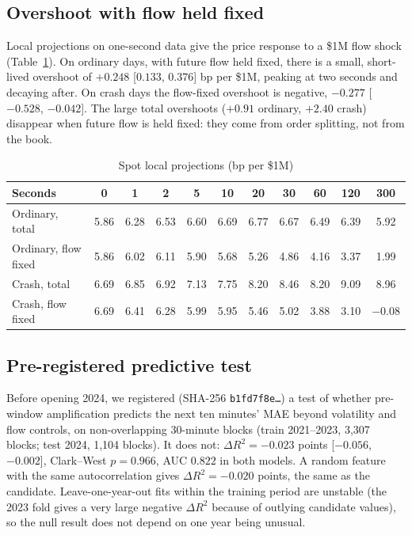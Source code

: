 \documentclass[12pt]{article}
\theoremstyle{definition}
\theoremstyle{remark}
\begin{document}
\subsection{Overshoot with flow held fixed}
Local projections on one-second data give the price response to a \$1M flow shock (Table~\ref{tab:spotlp}). On ordinary days, with future flow held fixed, there is a small, short-lived overshoot of $+0.248$ [$0.133$, $0.376$] bp per \$1M, peaking at two seconds and decaying after. On crash days the flow-fixed overshoot is negative, $-0.277$ [$-0.528$, $-0.042$]. The large total overshoots ($+0.91$ ordinary, $+2.40$ crash) disappear when future flow is held fixed: they come from order splitting, not from the book.

\begin{table}[t]\centering\small
\begin{threeparttable}
\caption{Spot local projections (bp per \$1M)}\label{tab:spotlp}
\setlength{\tabcolsep}{3.5pt}
\begin{tabular}{lcccccccccc}
\toprule
Seconds & 0 & 1 & 2 & 5 & 10 & 20 & 30 & 60 & 120 & 300\\
\midrule
Ordinary, total & 5.86 & 6.28 & 6.53 & 6.60 & 6.69 & 6.77 & 6.67 & 6.49 & 6.39 & 5.92\\
Ordinary, flow fixed & 5.86 & 6.02 & 6.11 & 5.90 & 5.68 & 5.26 & 4.86 & 4.16 & 3.37 & 1.99\\
Crash, total & 6.69 & 6.85 & 6.92 & 7.13 & 7.75 & 8.20 & 8.46 & 8.20 & 9.09 & 8.96\\
Crash, flow fixed & 6.69 & 6.41 & 6.28 & 5.99 & 5.95 & 5.46 & 5.02 & 3.88 & 3.10 & $-0.08$\\
\bottomrule
\end{tabular}
\begin{tablenotes}\footnotesize\item\end{tablenotes}
\end{threeparttable}
\end{table}

\subsection{Pre-registered predictive test}
Before opening 2024, we registered (SHA-256 \texttt{b1fd7f8e\ldots}) a test of whether pre-window amplification predicts the next ten minutes' MAE beyond volatility and flow controls, on non-overlapping 30-minute blocks (train 2021--2023, 3,307 blocks; test 2024, 1,104 blocks). It does not: $\Delta R^2=-0.023$ points [$-0.056$, $-0.002$], Clark--West $p=0.966$, AUC $0.822$ in both models. A random feature with the same autocorrelation gives $\Delta R^2=-0.020$ points, the same as the candidate. Leave-one-year-out fits within the training period are unstable (the 2023 fold gives a very large negative $\Delta R^2$ because of outlying candidate values), so the null result does not depend on one year being unusual.
\end{document}
